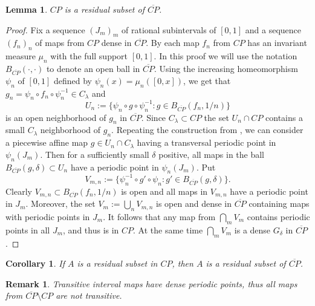 \documentclass[12pt, a4paper]{amsart}
\newtheorem{lemma}[theorem]{Lemma}
\newtheorem{corollary}[theorem]{Corollary}
\newtheorem{remark}[theorem]{Remark}
\newcommand{\?}{{\bf ???}}
\def\CP{\overline{CP}}
\begin{document}
\begin{lemma}\label{l1}
$CP$ is a residual subset of $\CP$.
\end{lemma}
\begin{proof}
Fix a sequence $(J_m)_m$ of rational subintervals of $[0,1]$
and a sequence $(f_n)_n$ of maps from $CP$ dense in $\CP$. 
By \cite[Remark p.~2]{BCOT} each map $f_n$ from $CP$ has an invariant measure $\mu_n$ with the full support $[0,1]$. 
In this proof we will use the notation $B_{\CP}(\cdot,\cdot)$ to denote an open ball in $\CP$.
Using the increasing homeomorphism $\psi_n$ of $[0,1]$ defined by $\psi_n(x)=\mu_n([0,x])$, we get that $g_n=\psi_n\circ f_n\circ \psi_n^{-1}\in C_{\lambda}$ and
$$
 U_n:=\{\psi_n\circ g\circ \psi_n^{-1}: g\in B_{\CP}(f_n,1/n)\}
$$
 is an open neighborhood of $g_n$ in $\CP$.
Since $C_\lambda \subset CP$ the set $U_n \cap CP$ contains a small  $C_\lambda$ neighborhood  of $g_n $.
 Repeating the construction from \cite[Lemma 12]{BCOT}, we can consider a piecewise affine map $g\in U_n\cap C_{\lambda}$ having a transversal periodic point in $\psi_n(J_m)$. Then for a sufficiently small $\delta$ positive, all maps in the ball $B_{\CP}(g,\delta)\subset U_n$ have a periodic point in $\psi_n(J_m)$. Put
$$
V_{m,n}:=\{\psi_n^{-1}\circ g'\circ \psi_n: g' \in B_{\CP}(g,\delta)\}.
$$
Clearly $V_{m,n}\subset B_{\CP}(f_n,1/n)$ is open and all maps in $V_{m,n}$ have a periodic point in $J_m$.  Moreover, the set $V_m :=\bigcup_n V_{m,n}$ is open and dense in $\CP$ containing maps with periodic points in $J_m$. It follows that any map from $\bigcap_mV_m$ contains periodic points in all $J_m$, and thus is in  $CP$.
At the same time $\bigcap_mV_m$ is a dense $G_{\delta}$ in $\CP$.  
\end{proof}


\begin{corollary}\label{cor:resinCPresinCPclosure}
If $A$ is a residual subset in $CP$, then $A$ is a residual subset of $\CP$.
\end{corollary}

\begin{remark}
 Transitive interval maps have dense periodic points, thus all maps from $\overline{CP}\setminus CP$ are not transitive.
\end{remark}
\end{document}
